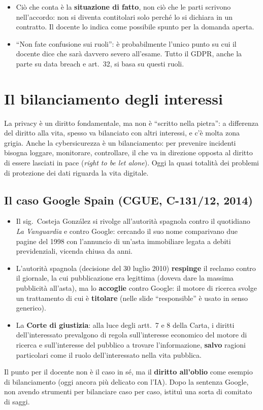 \begin{esame}
\begin{itemize}
  \item Ciò che conta è la \textbf{situazione di fatto}, non ciò che le parti scrivono nell'accordo:
    non si diventa contitolari solo perché lo si dichiara in un contratto. Il docente lo indica come
    possibile spunto per la domanda aperta.
  \item ``Non fate confusione sui ruoli'': è probabilmente l'unico punto su cui il docente dice che
    sarà davvero severo all'esame. Tutto il GDPR, anche la parte su data breach e art.~32, si basa su
    questi ruoli.
\end{itemize}
\end{esame}

\section{Il bilanciamento degli interessi}
La privacy è un diritto fondamentale, ma non è ``scritto nella pietra'': a differenza del diritto alla
vita, spesso va bilanciato con altri interessi, e c'è molta zona grigia. Anche la cybersicurezza è un
bilanciamento: per prevenire incidenti bisogna loggare, monitorare, controllare, il che va in
direzione opposta al diritto di essere lasciati in pace (\emph{right to be let alone}). Oggi la quasi
totalità dei problemi di protezione dei dati riguarda la vita digitale.

\subsection{Il caso Google Spain (CGUE, C-131/12, 2014)}
\begin{itemize}
  \item Il sig.\ Costeja González si rivolge all'autorità spagnola contro il quotidiano \emph{La
    Vanguardia} e contro Google: cercando il suo nome comparivano due pagine del 1998 con l'annuncio di
    un'asta immobiliare legata a debiti previdenziali, vicenda chiusa da anni.
  \item L'autorità spagnola (decisione del 30 luglio 2010) \textbf{respinge} il reclamo contro il
    giornale, la cui pubblicazione era legittima (doveva dare la massima pubblicità all'asta), ma lo
    \textbf{accoglie} contro Google: il motore di ricerca svolge un trattamento di cui è \textbf{titolare} (nelle slide ``responsible'' è usato in senso generico).
  \item La \textbf{Corte di giustizia}: alla luce degli artt.~7 e 8 della Carta, i diritti
    dell'interessato prevalgono di regola sull'interesse economico del motore di ricerca e
    sull'interesse del pubblico a trovare l'informazione, \textbf{salvo} ragioni particolari come il
    ruolo dell'interessato nella vita pubblica.
\end{itemize}
Il punto per il docente non è il caso in sé, ma il \textbf{diritto all'oblio} come esempio di
bilanciamento (oggi ancora più delicato con l'IA). Dopo la sentenza Google, non avendo strumenti per
bilanciare caso per caso, istituì una sorta di comitato di saggi.

